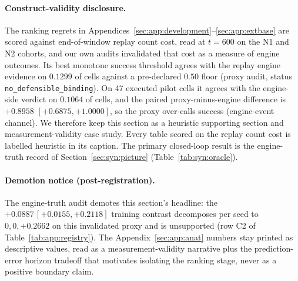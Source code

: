 \paragraph{Construct-validity disclosure.}\label{sec:exp:validity} The ranking regrets in Appendices~\ref{sec:app:development}--\ref{sec:app:extbase} are scored against end-of-window replay count cost, read at $t{=}600$ on the N1 and N2 cohorts, and our own audits invalidated that cost as a measure of engine outcomes. Its best monotone success threshold agrees with the replay engine evidence on $0.1299$ of cells against a pre-declared $0.50$ floor (proxy audit, status \texttt{no\_defensible\_binding}). On 47 executed pilot cells it agrees with the engine-side verdict on $0.1064$ of cells, and the paired proxy-minus-engine difference is $+0.8958$ $[+0.6875, +1.0000]$, so the proxy over-calls success (engine-event channel). We therefore keep this section as a heuristic supporting section and measurement-validity case study. Every table scored on the replay count cost is labelled heuristic in its caption. The primary closed-loop result is the engine-truth record of Section~\ref{sec:syn:picture} (Table~\ref{tab:syn:oracle}).

\paragraph{Demotion notice (post-registration).} The engine-truth audit demotes this section's headline: the $+0.0887\,[+0.0155, +0.2118]$ training contrast decomposes per seed to $0, 0, +0.2662$ on this invalidated proxy and is unsupported (row C2 of Table~\ref{tab:app:registry}). The Appendix~\ref{sec:app:anat} numbers stay printed as descriptive values, read as a measurement-validity narrative plus the prediction-error horizon tradeoff that motivates isolating the ranking stage, never as a positive boundary claim.
